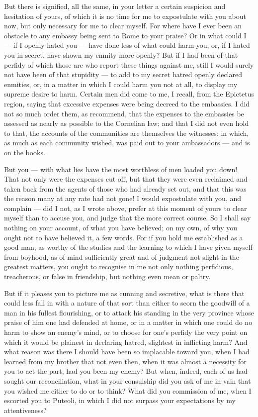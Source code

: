  But there is signified, all the same, in your letter a certain suspicion and hesitation of yours, of which it is no time for me to expostulate with you about now, but only necessary for me to clear myself. For where have I ever been an obstacle to any embassy being sent to Rome to your praise? Or in what could I --- if I openly hated you --- have done less of what could harm you, or, if I hated you in secret, have shown my enmity more openly? But if I had been of that perfidy of which those are who report these things against me, still I would surely not have been of that stupidity --- to add to my secret hatred openly declared enmities, or, in a matter in which I could harm you not at all, to display my supreme desire to harm. Certain men did come to me, I recall, from the Epictetus region, saying that excessive expenses were being decreed to the embassies. I did not so much order them, as recommend, that the expenses to the embassies be assessed as nearly as possible to the Cornelian law; and that I did not even hold to that, the accounts of the communities are themselves the witnesses: in which, as much as each community wished, was paid out to your ambassadors --- and is on the books.

 But you --- with what lies have the most worthless of men loaded you down! That not only were the expenses cut off, but that they were even reclaimed and taken back from the agents of those who had already set out, and that this was the reason many at any rate had not gone! I would expostulate with you, and complain --- did I not, as I wrote above, prefer at this moment of yours to clear myself than to accuse you, and judge that the more correct course. So I shall say nothing on your account, of what you have believed; on my own, of why you ought not to have believed it, a few words. For if you hold me established as a good man, as worthy of the studies and the learning to which I have given myself from boyhood, as of mind sufficiently great and of judgment not slight in the greatest matters, you ought to recognise in me not only nothing perfidious, treacherous, or false in friendship, but nothing even mean or paltry.

 But if it pleases you to picture me as cunning and secretive, what is there that could less fall in with a nature of that sort than either to scorn the goodwill of a man in his fullest flourishing, or to attack his standing in the very province whose praise of him one had defended at home, or in a matter in which one could do no harm to show an enemy's mind, or to choose for one's perfidy the very point on which it would be plainest in declaring hatred, slightest in inflicting harm? And what reason was there I should have been so implacable toward you, when I had learned from my brother that not even then, when it was almost a necessity for you to act the part, had you been my enemy? But when, indeed, each of us had sought our reconciliation, what in your consulship did you ask of me in vain that you wished me either to do or to think? What did you commission of me, when I escorted you to Puteoli, in which I did not surpass your expectations by my attentiveness?

